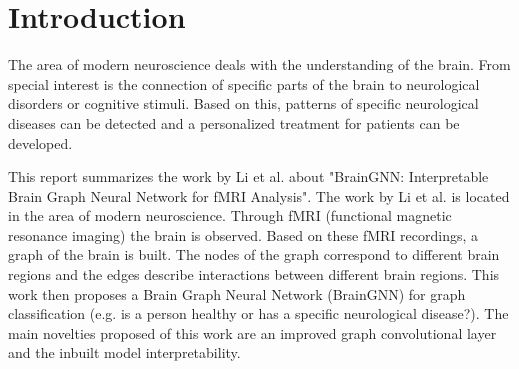 \section{Introduction}

The area of modern neuroscience deals with the understanding of the brain. From special interest is the connection of specific parts of the brain to neurological disorders or cognitive stimuli. 
Based on this, patterns of specific neurological diseases can be detected and a personalized treatment for patients can be developed.

This report summarizes the work by Li et al. \cite{LI2021102233} about "BrainGNN: In\-ter\-pre\-ta\-ble Brain Graph Neural Network for fMRI Analysis".
The work by Li et al. is located in the area of modern neuroscience. 
Through fMRI (functional magnetic resonance imaging) the brain is observed. Based on these fMRI recordings, a graph of the brain is built. The nodes of the graph correspond to different brain regions and the edges describe interactions between different brain regions. This work then proposes a Brain Graph Neural Network (BrainGNN) for graph classification (e.g. is a person healthy or has a specific neurological disease?).
The main novelties proposed of this work are an improved graph convolutional layer and the inbuilt model interpretability.